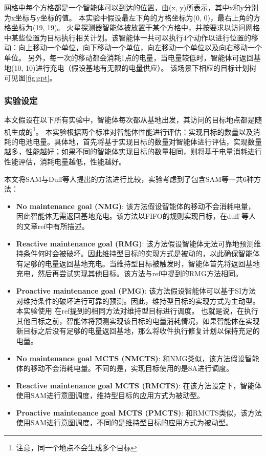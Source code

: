 网格中每个方格都是一个智能体可以到达的位置，由(x, y)所表示，其中x和y分别为x坐标与y坐标的值。
%
本实验中假设最左下角的方格坐标为(0, 0)，最右上角的方格坐标为(19, 19)。
% 
火星探测器智能体被放置于某个方格中，并按要求以访问网格中某些位置为目标执行相关计划。该智能体一共可以执行4个动作以进行位置的移动：向上移动一个单位，向下移动一个单位，向左移动一个单位以及向右移动一个单位。
% 
另外，每一次的移动都会消耗1点的电量，当电量较低时，智能体可返回基地(10, 10)进行充电（假设基地有无限的电量供应）。
%
该场景下相应的目标计划树可见图\ref{fig:gpt}。
\subsubsection{实验设定}
本文假设在以下所有实验中，智能体每次都从基地出发，其访问的目标地点都是随机生成的\footnote{注意，同一个地点不会生成多个目标}。
本实验根据两个标准对智能体性能进行评估：实现目标的数量以及消耗的电池电量。具体地，首先将基于实现目标的数量对智能体进行评估，实现数量越多，性能越好；如果不同的智能体实现目标的数量相同，则将基于电量消耗进行性能评估，消耗电量越低，性能越好。

本文将SAM与Duff等人提出的方法\cite{DBLP:conf/atal/DuffHT06}进行比较，实验考虑到了包含SAM等一共6种方法：

\begin{itemize}
\item \textbf{No maintenance goal (NMG)}: 该方法假设智能体的移动不会消耗电量，因此智能体无需返回基地充电。该方法以FIFO的规则实现目标，在duff 等人的文章ref中有所描述。
\item \textbf{Reactive maintenance goal (RMG)}: 该方法假设智能体无法可靠地预测维持条件何时会被破坏。因此维持型目标的实现方式是被动的，以此确保智能体有足够的电量返回基地充电。当维持型目标被触发时，智能体首先将返回基地充电，然后再尝试实现其他目标。该方法与ref中提到的RMG方法相同。
\item \textbf{Proactive maintenance goal (PMG)}: 该方法假设智能体可以基于SI方法对维持条件的破坏进行可靠的预测。因此，维持型目标的实现方式为主动型。本实验使用 在ref提到的相同方法对维持型目标进行调度。
%
也就是说，在执行其他目标之前，智能体将预测实现该目标的电量消耗情况，如果智能体在实现新目标之后没有足够的电量返回基地，那么将收件执行修复计划以保持充足的电量。
\item \textbf{No maintenance goal MCTS (NMCTS)}: 和NMG类似，该方法假设智能体的移动不会消耗电量。不同的是，实现目标使用的是SA进行调度。
\item \textbf{Reactive maintenance goal MCTS (RMCTS)}: 在该方法设定下，智能体使用SAM进行意图调度，维持型目标的应用方式为被动型。
\item \textbf{Proactive maintenance goal MCTS (PMCTS)}: 和RMCTS类似，该方法使用SAM进行意图调度，不同的是维持型目标的应用方式为被动型。
\end{itemize}

